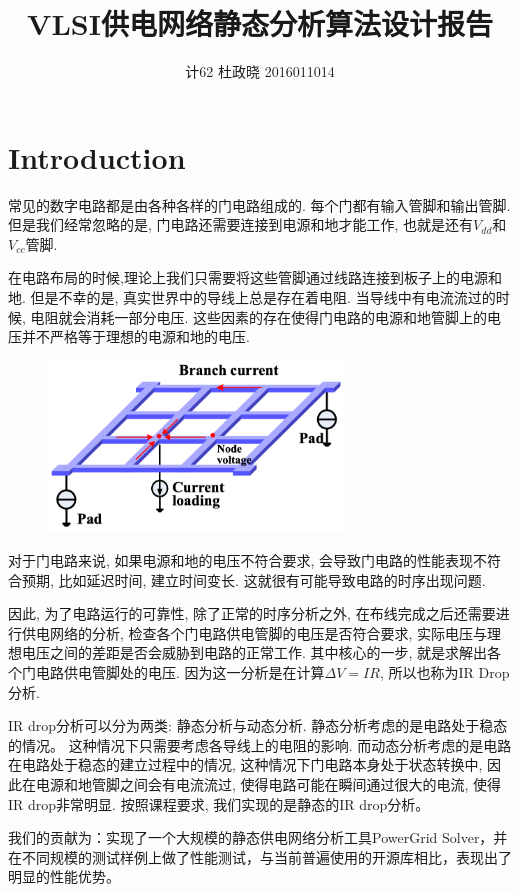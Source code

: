 \documentclass[UTF8,11pt]{report}
\title{VLSI供电网络静态分析算法设计报告}
\author{计62 杜政晓 2016011014}
\begin{document}
\maketitle
\section{Introduction}
常见的数字电路都是由各种各样的门电路组成的. 每个门都有输入管脚和输出管脚. 但是我们经常忽略的是, 门电路还需要连接到电源和地才能工作, 也就是还有$V_{dd}$和$V_{cc}$管脚. 

在电路布局的时候,理论上我们只需要将这些管脚通过线路连接到板子上的电源和地. 但是不幸的是, 真实世界中的导线上总是存在着电阻. 当导线中有电流流过的时候, 电阻就会消耗一部分电压. 这些因素的存在使得门电路的电源和地管脚上的电压并不严格等于理想的电源和地的电压.

\begin{figure}[!ht]
	\centering
	\includegraphics[width=0.7\textwidth]{circuit}
\end{figure}

对于门电路来说, 如果电源和地的电压不符合要求, 会导致门电路的性能表现不符合预期, 比如延迟时间, 建立时间变长. 这就很有可能导致电路的时序出现问题.

因此, 为了电路运行的可靠性, 除了正常的时序分析之外, 在布线完成之后还需要进行供电网络的分析, 检查各个门电路供电管脚的电压是否符合要求, 实际电压与理想电压之间的差距是否会威胁到电路的正常工作. 其中核心的一步, 就是求解出各个门电路供电管脚处的电压. 因为这一分析是在计算$\Delta V = IR$, 所以也称为IR Drop分析.

IR drop分析可以分为两类: 静态分析与动态分析. 静态分析考虑的是电路处于稳态的情况。 这种情况下只需要考虑各导线上的电阻的影响. 而动态分析考虑的是电路在电路处于稳态的建立过程中的情况, 这种情况下门电路本身处于状态转换中, 因此在电源和地管脚之间会有电流流过, 使得电路可能在瞬间通过很大的电流, 使得IR drop非常明显. 按照课程要求, 我们实现的是静态的IR drop分析。

我们的贡献为：实现了一个大规模的静态供电网络分析工具PowerGrid Solver，并在不同规模的测试样例上做了性能测试，与当前普遍使用的开源库相比，表现出了明显的性能优势。
\end{document}

